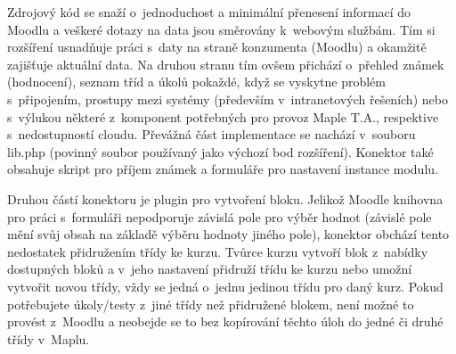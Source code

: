 \documentclass[
print,
  11pt,
  table,   
  nolof,    
  nolot,
  oneside,
  draft
]{fithesis3}
\begin{document}
Zdrojový kód se snaží o~jednoduchost a minimální přenesení informací do Moodlu a veškeré dotazy na data jsou směrovány k~webovým službám. Tím si rozšíření usnadňuje práci s~daty na straně konzumenta (Moodlu) a okamžitě zajišťuje aktuální data. Na druhou stranu tím ovšem přichází o~přehled známek (hodnocení), seznam tříd a úkolů pokaždé, když se vyskytne problém s~připojením, prostupy mezi systémy (především v~intranetových řešeních) nebo s~výlukou některé z~komponent potřebných pro provoz Maple T.A., respektive s~nedostupností cloudu. Převážná část implementace se nachází v~souboru lib.php (povinný soubor používaný jako výchozí bod rozšíření). Konektor také obsahuje skript pro příjem známek a formuláře pro nastavení instance modulu. 

Druhou částí konektoru je plugin pro vytvoření bloku. Jelikož Moodle knihovna pro práci s~formuláři nepodporuje závislá pole pro výběr hodnot (závislé pole mění svůj obsah na základě výběru hodnoty jiného pole), konektor obchází tento nedostatek přidružením třídy ke kurzu. Tvůrce kurzu vytvoří blok z~nabídky dostupných bloků a v~jeho nastavení přidruží třídu ke kurzu nebo umožní vytvořit novou třídy, vždy se jedná o~jednu jedinou třídu pro daný kurz. Pokud potřebujete úkoly/testy z~jiné třídy než přidružené blokem, není možné to provést z~Moodlu a neobejde se to bez kopírování těchto úloh do jedné či druhé třídy v~Maplu. 
\end{document}
